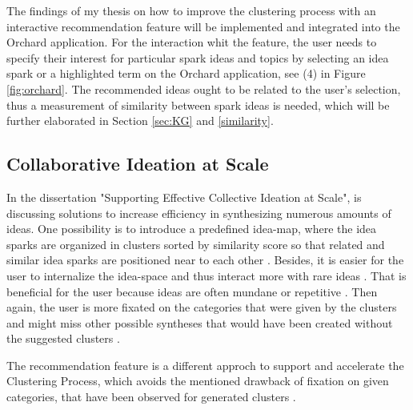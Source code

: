 \documentclass[pdftex,a4paper,12pt]{scrartcl}
\theoremstyle{definition}
\begin{document}
    The findings of my thesis on how to improve the clustering process with an interactive recommendation feature will be implemented and integrated into the Orchard application. For the interaction whit the feature, the user needs to specify their interest for particular spark ideas and topics by selecting an idea spark or a highlighted term on the Orchard application, see (4) in Figure \ref{fig:orchard}. The recommended ideas ought to be related to the user's selection, thus a measurement of similarity between spark ideas is needed, which will be further elaborated in Section \ref{sec:KG} and \ref{similarity}.
    
    
    
\subsection{Collaborative Ideation at Scale}\label{sec:scale}
In the dissertation "Supporting Effective Collective Ideation at Scale", \citet{siangliulue_supporting_2017} is discussing solutions to increase efficiency in synthesizing numerous amounts of ideas. One possibility is to introduce a predefined idea-map, where the idea sparks are organized in clusters sorted by similarity score so that related and similar idea sparks are positioned near to each other \citep[124]{siangliulue_supporting_2017}. Besides, it is easier for the user to internalize the idea-space and thus interact more with rare ideas \citep{siangliulue_supporting_2017}. That is beneficial for the user because ideas are often mundane or repetitive \citep{siangliulue_ideahound:_2016}. Then again, the user is more fixated on the categories that were given by the clusters and might miss other possible syntheses that would have been created without the suggested clusters \citep{siangliulue_supporting_2017}.

The recommendation feature is a different approch to support and accelerate the Clustering Process, which avoids the mentioned drawback of fixation on given categories, that have been observed for generated clusters \citep{siangliulue_supporting_2017}.
\end{document}
